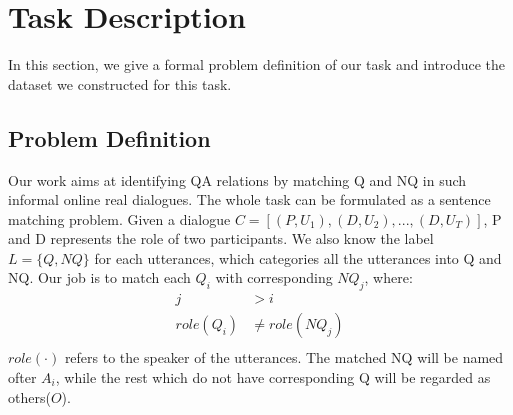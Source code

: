 \section{Task Description}
In this section, we give a formal problem definition of our task and introduce the dataset we constructed for this task. 
\label{sec:problem}
\subsection{Problem Definition}
Our work aims at identifying QA relations by matching Q and NQ in such informal online real dialogues.
The whole task can be formulated as a sentence matching problem. Given a dialogue $C=[(P,U_1),(D,U_2),...,(D,U_T)]$, P and D represents the role of two participants. We also know the label $L=\{Q,NQ\}$ for each utterances, which categories all the utterances into Q and NQ. 
Our job is to match each $Q_i$ with corresponding ${NQ_j}$, where:
\begin{equation}
\begin{aligned}
j&>i\\
role(Q_i)&\not=role({NQ_j})\\
\end{aligned}
\end{equation}
$role(\cdot)$ refers to the speaker of the utterances. The matched NQ will be named ofter $A_i$, while the rest which do not have corresponding Q will be regarded as others($O$).




